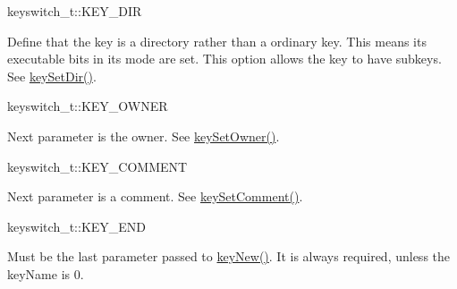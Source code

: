 \begin{DoxyItemize}
\item keyswitch\-\_\-t\-::\-K\-E\-Y\-\_\-\-D\-I\-R \par
 Define that the key is a directory rather than a ordinary key. This means its executable bits in its mode are set. This option allows the key to have subkeys. See \hyperlink{group__keymeta_gaae575bd86a628a15ee45baa860522e75}{key\-Set\-Dir()}.
\item keyswitch\-\_\-t\-::\-K\-E\-Y\-\_\-\-O\-W\-N\-E\-R \par
 Next parameter is the owner. See \hyperlink{group__keyname_ga88d6ec200ba0707b7c1b4a88133d2be4}{key\-Set\-Owner()}.
\item keyswitch\-\_\-t\-::\-K\-E\-Y\-\_\-\-C\-O\-M\-M\-E\-N\-T \par
 Next parameter is a comment. See \hyperlink{group__keyvalue_ga8863a877a84fa46e6017fe72e49b89c1}{key\-Set\-Comment()}.
\item keyswitch\-\_\-t\-::\-K\-E\-Y\-\_\-\-E\-N\-D \par
 Must be the last parameter passed to \hyperlink{group__key_gaf6893c038b3ebee90c73a9ea8356bebf}{key\-New()}. It is always required, unless the {\ttfamily key\-Name} is 0.
\end{DoxyItemize}

